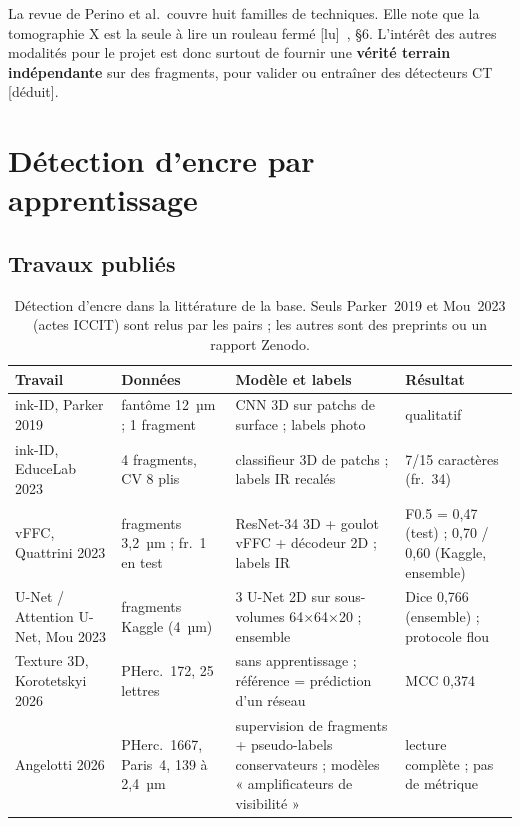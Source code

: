\documentclass[11pt,a4paper]{article}
\newcommand{\lu}{\textsf{\small[lu]}}
\newcommand{\deduit}{\textsf{\small[déduit]}}
\newcommand{\pherc}[1]{PHerc.~#1}
\begin{document}
\noindent La revue de Perino et al.\ couvre huit familles de techniques. Elle note que la
tomographie X est la seule à lire un rouleau fermé \lu~\cite{perino2024}, §6. L'intérêt des
autres modalités pour le projet est donc surtout de fournir une \textbf{vérité terrain
indépendante} sur des fragments, pour valider ou entraîner des détecteurs CT \deduit.

\section{Détection d'encre par apprentissage}

\subsection{Travaux publiés}

\begin{table}[h]
\centering\small
\begin{tabularx}{\linewidth}{@{}p{3.3cm}p{3.2cm}Lp{2.8cm}@{}}
\toprule
Travail & Données & Modèle et labels & Résultat \\
\midrule
ink-ID, Parker 2019 \cite{parker2019} & fantôme 12~µm ; 1 fragment & CNN 3D sur patchs de surface ; labels photo & qualitatif \\
ink-ID, EduceLab 2023 \cite{parsons2023} & 4 fragments, CV 8 plis & classifieur 3D de patchs ; labels IR recalés & 7/15 caractères (fr.~34) \\
vFFC, Quattrini 2023 \cite{quattrini2023} & fragments 3,2~µm ; fr.~1 en test & ResNet-34 3D + goulot vFFC + décodeur 2D ; labels IR & F0.5 = 0,47 (test) ; 0,70 / 0,60 (Kaggle, ensemble) \\
U-Net / Attention U-Net, Mou 2023 \cite{mou2023} & fragments Kaggle (4~µm) & 3 U-Net 2D sur sous-volumes 64×64×20 ; ensemble & Dice 0,766 (ensemble) ; protocole flou \\
Texture 3D, Korotetskyi 2026 \cite{korotetskyi2026} & \pherc{172}, 25 lettres & sans apprentissage ; référence = prédiction d'un réseau & MCC 0,374 \\
Angelotti 2026 \cite{angelotti2026complete} & \pherc{1667}, Paris~4, 139 à 2,4~µm & supervision de fragments + pseudo-labels conservateurs ; modèles « amplificateurs de visibilité » & lecture complète ; pas de métrique \\
\bottomrule
\end{tabularx}
\caption{Détection d'encre dans la littérature de la base. Seuls Parker~2019 et Mou~2023
(actes ICCIT) sont relus par les pairs ; les autres sont des preprints ou un rapport Zenodo.}
\end{table}
\end{document}
